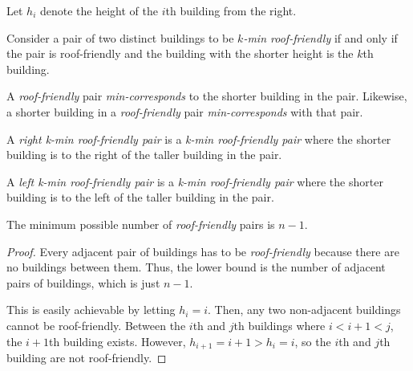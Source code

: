 \documentclass[10pt]{../usamts}
\begin{document}
\begin{solution}

\begin{definition}
    Let $h_i$ denote the height of the $i$th building from the right.
\end{definition}

\begin{definition}
    Consider a pair of two distinct buildings to be \textit{$k$-min roof-friendly} if and only if the pair is roof-friendly and the building with the shorter height is the $k$th building. 
\end{definition}

\begin{definition}
    A \textit{roof-friendly} pair \textit{min-corresponds} to the shorter building in the pair. Likewise, a shorter building in a \textit{roof-friendly} pair \textit{min-corresponds} with that pair.
\end{definition}

\begin{definition}
A \textit{right k-min roof-friendly pair} is a \textit{k-min roof-friendly pair} where the shorter building is to the right of the taller building in the pair.
\end{definition}

\begin{definition}
A \textit{left k-min roof-friendly pair} is a \textit{k-min roof-friendly pair} where the shorter building is to the left of the taller building in the pair.
\end{definition}

\begin{claim}
    The minimum possible number of \textit{roof-friendly} pairs is $\boxed{n-1}$.
\end{claim}

\begin{proof}
    Every adjacent pair of buildings has to be \textit{roof-friendly} because there are no buildings between them. Thus, the lower bound is the number of adjacent pairs of buildings, which is just $n-1$.
    
    This is easily achievable by letting $h_i = i$. Then, any two non-adjacent buildings cannot be roof-friendly. Between the $i$th and $j$th buildings where $i < i+1 < j$, the $i+1$th building exists. However, $h_{i+1} = i+1 > h_i = i$, so the $i$th and $j$th building are not roof-friendly.
\end{proof}


\end{solution}
\end{document}
